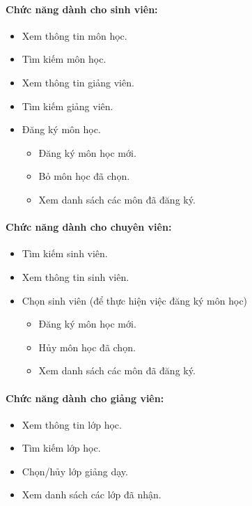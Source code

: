 \documentclass{article}
\begin{document}
    \paragraph{Chức năng dành cho sinh viên:}
    \begin{itemize}
      \item Xem thông tin môn học.
      \item Tìm kiếm môn học.
      \item Xem thông tin giảng viên.
      \item Tìm kiếm giảng viên.
      \item Đăng ký môn học.
      \begin{itemize}
        \item Đăng ký môn học mới.
        \item Bỏ môn học đã chọn.
        \item Xem danh sách các môn đã đăng ký.
      \end{itemize}
    \end{itemize}

    \paragraph{Chức năng dành cho chuyên viên:}
    \begin{itemize}
      \item Tìm kiếm sinh viên.
      \item Xem thông tin sinh viên.
      \item Chọn sinh viên (để thực hiện việc đăng ký môn học)
      \begin{itemize}
        \item Đăng ký môn học mới.
        \item Hủy môn học đã chọn.
        \item Xem danh sách các môn đã đăng ký.
      \end{itemize}
    \end{itemize}

    \paragraph{Chức năng dành cho giảng viên:}
    \begin{itemize}
      \item Xem thông tin lớp học.
      \item Tìm kiếm lớp học.
      \item Chọn/hủy lớp giảng dạy.
      \item Xem danh sách các lớp đã nhận.
    \end{itemize}
\end{document}
